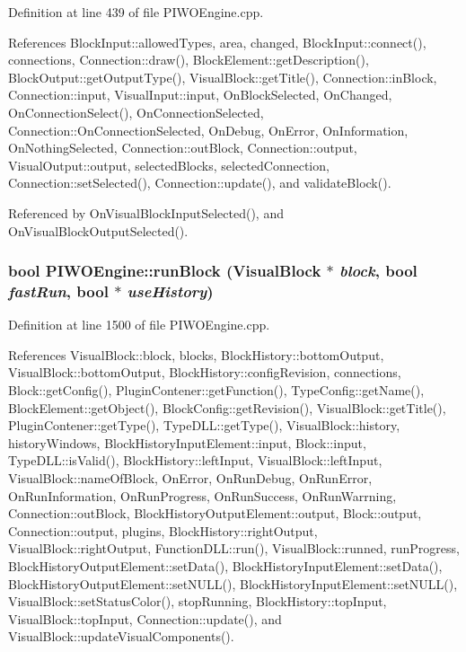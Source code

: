 Definition at line 439 of file PIWOEngine.cpp.

References BlockInput::allowedTypes, area, changed, BlockInput::connect(), connections, Connection::draw(), BlockElement::getDescription(), BlockOutput::getOutputType(), VisualBlock::getTitle(), Connection::inBlock, Connection::input, VisualInput::input, OnBlockSelected, OnChanged, OnConnectionSelect(), OnConnectionSelected, Connection::OnConnectionSelected, OnDebug, OnError, OnInformation, OnNothingSelected, Connection::outBlock, Connection::output, VisualOutput::output, selectedBlocks, selectedConnection, Connection::setSelected(), Connection::update(), and validateBlock().

Referenced by OnVisualBlockInputSelected(), and OnVisualBlockOutputSelected().\hypertarget{classPIWOEngine_ea240e8aed286fe05d3baf086d9d9c85}{
\subsubsection[runBlock]{\setlength{\rightskip}{0pt plus 5cm}bool PIWOEngine::runBlock ({\bf VisualBlock} $\ast$ {\em block}, \/  bool {\em fastRun}, \/  bool $\ast$ {\em useHistory})}}
\label{classPIWOEngine_ea240e8aed286fe05d3baf086d9d9c85}




Definition at line 1500 of file PIWOEngine.cpp.

References VisualBlock::block, blocks, BlockHistory::bottomOutput, VisualBlock::bottomOutput, BlockHistory::configRevision, connections, Block::getConfig(), PluginContener::getFunction(), TypeConfig::getName(), BlockElement::getObject(), BlockConfig::getRevision(), VisualBlock::getTitle(), PluginContener::getType(), TypeDLL::getType(), VisualBlock::history, historyWindows, BlockHistoryInputElement::input, Block::input, TypeDLL::isValid(), BlockHistory::leftInput, VisualBlock::leftInput, VisualBlock::nameOfBlock, OnError, OnRunDebug, OnRunError, OnRunInformation, OnRunProgress, OnRunSuccess, OnRunWarrning, Connection::outBlock, BlockHistoryOutputElement::output, Block::output, Connection::output, plugins, BlockHistory::rightOutput, VisualBlock::rightOutput, FunctionDLL::run(), VisualBlock::runned, runProgress, BlockHistoryOutputElement::setData(), BlockHistoryInputElement::setData(), BlockHistoryOutputElement::setNULL(), BlockHistoryInputElement::setNULL(), VisualBlock::setStatusColor(), stopRunning, BlockHistory::topInput, VisualBlock::topInput, Connection::update(), and VisualBlock::updateVisualComponents().

